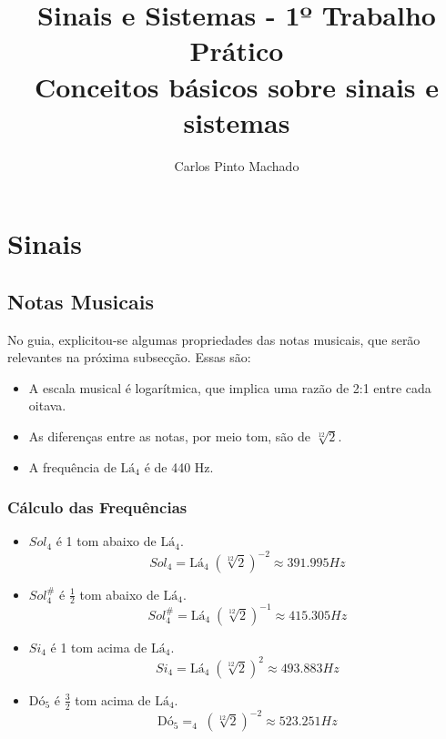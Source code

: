 \documentclass[12pt,a4paper]{article}
\author{Carlos Pinto Machado}
\title{
	Sinais e Sistemas - 1º Trabalho Prático \\
	Conceitos básicos sobre sinais e sistemas
}
\begin{document}
\maketitle

\tableofcontents

\newpage

\section{Sinais}
\subsection{Notas Musicais}
No guia, explicitou-se algumas propriedades das notas musicais, que serão 
relevantes na próxima subsecção.
Essas são:

\begin{itemize}
\item A escala musical é logarítmica, que implica uma razão de 2:1 entre cada 
oitava.
\item As diferenças entre as notas, por meio tom, são de $\sqrt[12]{2}$.
\item A frequência de $\text{Lá}_4$ é de 440 Hz.
\end{itemize}

\subsubsection{Cálculo das Frequências}
\begin{itemize}
\item $Sol_4$ é 1 tom abaixo de $\text{Lá}_4$.	
	\begin{equation}
		Sol_4 = \text{Lá}_4 \; (\sqrt[12]{2})^{-2} \approx 391.995 Hz
	\end{equation}
	
\item $Sol_4^\#$ é $\frac{1}{2}$ tom abaixo de $\text{Lá}_4$.	
	\begin{equation}
		Sol_4^\# = \text{Lá}_4 \; (\sqrt[12]{2})^{-1} \approx 415.305 Hz
	\end{equation}
	
\item $Si_4$ é 1 tom acima de $\text{Lá}_4$.	
	\begin{equation}
		Si_4 = \text{Lá}_4 \; (\sqrt[12]{2})^2 \approx 493.883 Hz
	\end{equation}
	
\item $\text{Dó}_5$ é $\frac{3}{2}$ tom acima de $\text{Lá}_4$.	
	\begin{equation}
		\text{Dó}_5 = _4 \; (\sqrt[12]{2})^{-2} \approx 523.251 Hz
	\end{equation}
\end{itemize}
\end{document}
